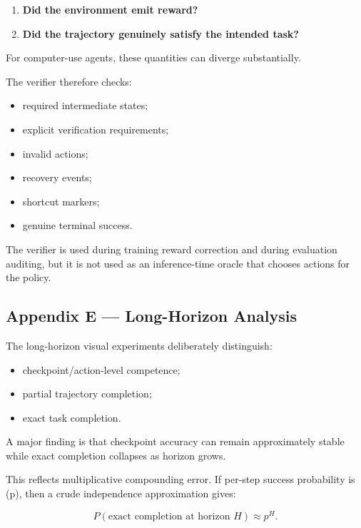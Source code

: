 \documentclass[
]{article}
\providecommand{\tightlist}{%
  \setlength{\itemsep}{0pt}\setlength{\parskip}{0pt}}
\begin{document}
\begin{enumerate}
\def\labelenumi{\arabic{enumi}.}
\tightlist
\item
  \textbf{Did the environment emit reward?}
\item
  \textbf{Did the trajectory genuinely satisfy the intended task?}
\end{enumerate}

For computer-use agents, these quantities can diverge substantially.

The verifier therefore checks:

\begin{itemize}
\tightlist
\item
  required intermediate states;
\item
  explicit verification requirements;
\item
  invalid actions;
\item
  recovery events;
\item
  shortcut markers;
\item
  genuine terminal success.
\end{itemize}

The verifier is used during training reward correction and during
evaluation auditing, but it is not used as an inference-time oracle that
chooses actions for the policy.

\subsection{Appendix E --- Long-Horizon
Analysis}\label{appendix-e-long-horizon-analysis}

The long-horizon visual experiments deliberately distinguish:

\begin{itemize}
\tightlist
\item
  checkpoint/action-level competence;
\item
  partial trajectory completion;
\item
  exact task completion.
\end{itemize}

A major finding is that checkpoint accuracy can remain approximately
stable while exact completion collapses as horizon grows.

This reflects multiplicative compounding error. If per-step success
probability is (p), then a crude independence approximation gives:

\[ P(\text{exact completion at horizon } H) \approx p^H. \]
\end{document}
